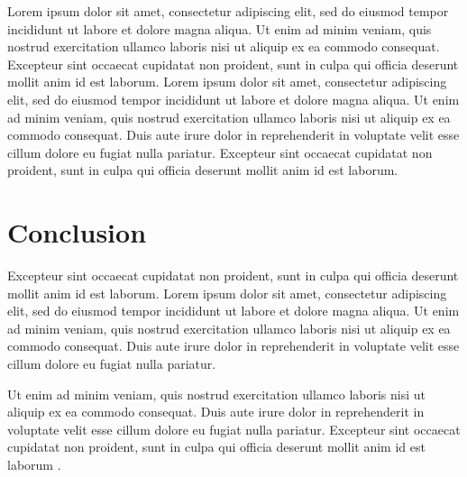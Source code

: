 \documentclass[english]{sbcreviews-2025}%
\begin{document}
Lorem ipsum dolor sit amet, consectetur adipiscing elit, sed do eiusmod tempor incididunt ut labore et dolore magna aliqua. Ut enim ad minim veniam, quis nostrud exercitation ullamco laboris nisi ut aliquip ex ea commodo consequat. Excepteur sint occaecat cupidatat non proident, sunt in culpa qui officia deserunt mollit anim id est laborum. Lorem ipsum dolor sit amet, consectetur adipiscing elit, sed do eiusmod tempor incididunt ut labore et dolore magna aliqua. Ut enim ad minim veniam, quis nostrud exercitation ullamco laboris nisi ut aliquip ex ea commodo consequat. Duis aute irure dolor in reprehenderit in voluptate velit esse cillum dolore eu fugiat nulla pariatur. Excepteur sint occaecat cupidatat non proident, sunt in culpa qui officia deserunt mollit anim id est laborum.

\section{Conclusion}

Excepteur sint occaecat cupidatat non proident, sunt in culpa qui officia deserunt mollit anim id est laborum. Lorem ipsum dolor sit amet, consectetur adipiscing elit, sed do eiusmod tempor incididunt ut labore et dolore magna aliqua. Ut enim ad minim veniam, quis nostrud exercitation ullamco laboris nisi ut aliquip ex ea commodo consequat. Duis aute irure dolor in reprehenderit in voluptate velit esse cillum dolore eu fugiat nulla pariatur.

Ut enim ad minim veniam, quis nostrud exercitation ullamco laboris nisi ut aliquip ex ea commodo consequat. Duis aute irure dolor in reprehenderit in voluptate velit esse cillum dolore eu fugiat nulla pariatur. Excepteur sint occaecat cupidatat non proident, sunt in culpa qui officia deserunt mollit anim id est laborum \citep{ref5}.
\end{document}
